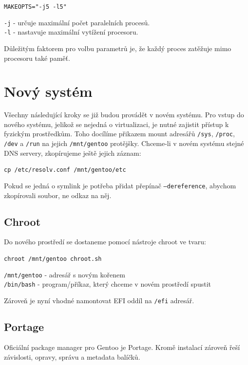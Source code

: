 \documentclass[12pt,a4paper,twoside,]{article}
\begin{document}
{{{{{{{\texttt{MAKEOPTS="-j5 -l5"}

\hspace{-1.5em}\texttt{-j} - určuje maximální počet paralelních procesů.\\
\texttt{-l} - nastavuje maximální vytížení procesoru.

\hspace{-1.5em}Důležitým faktorem pro volbu parametrů je, že každý proces zatěžuje mimo procesoru také paměť.

\newpage
\section{\textsf{Nový systém}}
Všechny následující kroky se již budou provádět v novém systému.
Pro vstup do nového systému, jelikož se nejedná o virtualizaci, je nutné zajistit přístup k fyzickým prostředkům.
Toho docílíme přikazem mount adresářů \texttt{/sys}, \texttt{/proc}, \texttt{/dev} a \texttt{/run} na jejich \texttt{/mnt/gentoo} protějšky. Chceme-li v novém 
systému stejné DNS servery, zkopírujeme ještě jejich záznam: 

\texttt{cp /etc/resolv.conf /mnt/gentoo/etc} 

\hspace{-1.5em}Pokud se jedná o symlink je potřeba přidat přepínač  \texttt{--dereference}, 
abychom zkopírovali soubor, ne odkaz na něj. 
\subsection{\textsf{Chroot}}
Do nového prostředí se dostaneme pomocí nástroje chroot ve tvaru:

\texttt{chroot /mnt/gentoo chroot.sh}

\hspace{-1.5em}\texttt{/mnt/gentoo} - adresář s novým kořenem\\
\texttt{/bin/bash} - program/příkaz, který chceme v novém prostředí spustit

\hspace{-1.5em}Zároveň je nyní vhodné namontovat EFI oddíl na \texttt{/efi} adresář.
\subsection{\textsf{Portage}}
Oficiální package manager pro Gentoo je Portage. Kromě instalací zároveň řeší závislosti, opravy, správu a metadata balíčků.
}}}}}}}
\end{document}
